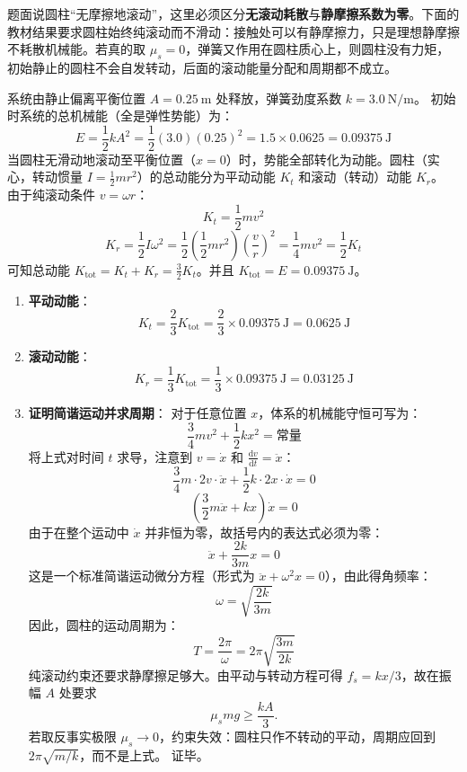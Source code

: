 \begin{solution}
题面说圆柱“无摩擦地滚动”，这里必须区分\textbf{无滚动耗散}与\textbf{静摩擦系数为零}。下面的教材结果要求圆柱始终纯滚动而不滑动：接触处可以有静摩擦力，只是理想静摩擦不耗散机械能。若真的取 $\mu_s=0$，弹簧又作用在圆柱质心上，则圆柱没有力矩，初始静止的圆柱不会自发转动，后面的滚动能量分配和周期都不成立。

系统由静止偏离平衡位置 $A = 0.25 \ \mathrm{m}$ 处释放，弹簧劲度系数 $k = 3.0 \ \mathrm{N/m}$。
初始时系统的总机械能（全是弹性势能）为：
$$ E = \frac{1}{2} k A^2 = \frac{1}{2} (3.0) (0.25)^2 = 1.5 \times 0.0625 = 0.09375 \ \mathrm{J} $$
当圆柱无滑动地滚动至平衡位置（$x = 0$）时，势能全部转化为动能。圆柱（实心，转动惯量 $I = \frac{1}{2} m r^2$）的总动能分为平动动能 $K_t$ 和滚动（转动）动能 $K_r$。
由于纯滚动条件 $v = \omega r$：
$$ K_t = \frac{1}{2} m v^2 $$
$$ K_r = \frac{1}{2} I \omega^2 = \frac{1}{2} \left( \frac{1}{2} m r^2 \right) \left( \frac{v}{r} \right)^2 = \frac{1}{4} m v^2 = \frac{1}{2} K_t $$
可知总动能 $K_{\text{tot}} = K_t + K_r = \frac{3}{2} K_t$。并且 $K_{\text{tot}} = E = 0.09375 \ \mathrm{J}$。

\begin{enumerate}
    \item[(a)] \textbf{平动动能}：
    $$ K_t = \frac{2}{3} K_{\text{tot}} = \frac{2}{3} \times 0.09375 \ \mathrm{J} = 0.0625 \ \mathrm{J} $$

    \item[(b)] \textbf{滚动动能}：
    $$ K_r = \frac{1}{3} K_{\text{tot}} = \frac{1}{3} \times 0.09375 \ \mathrm{J} = 0.03125 \ \mathrm{J} $$

    \item[(c)] \textbf{证明简谐运动并求周期}：
    对于任意位置 $x$，体系的机械能守恒可写为：
    $$ \frac{3}{4} m v^2 + \frac{1}{2} k x^2 = \text{常量} $$
    将上式对时间 $t$ 求导，注意到 $v = \dot{x}$ 和 $\frac{\mathrm{d}v}{\mathrm{d}t} = \ddot{x}$：
    $$ \frac{3}{4} m \cdot 2v \cdot \ddot{x} + \frac{1}{2} k \cdot 2x \cdot \dot{x} = 0 $$
    $$ \left( \frac{3}{2} m \ddot{x} + k x \right) \dot{x} = 0 $$
    由于在整个运动中 $\dot{x}$ 并非恒为零，故括号内的表达式必须为零：
    $$ \ddot{x} + \frac{2k}{3m} x = 0 $$
    这是一个标准简谐运动微分方程（形式为 $\ddot{x} + \omega^2 x = 0$），由此得角频率：
    $$ \omega = \sqrt{\frac{2k}{3m}} $$
    因此，圆柱的运动周期为：
    $$ T = \frac{2\pi}{\omega} = 2\pi \sqrt{\frac{3m}{2k}} $$
    纯滚动约束还要求静摩擦足够大。由平动与转动方程可得 $f_s=kx/3$，故在振幅 $A$ 处要求
    $$ \mu_s mg\ge \frac{kA}{3}. $$
    若取反事实极限 $\mu_s\to0$，约束失效：圆柱只作不转动的平动，周期应回到 $2\pi\sqrt{m/k}$，而不是上式。
    证毕。
\end{enumerate}
\end{solution}

